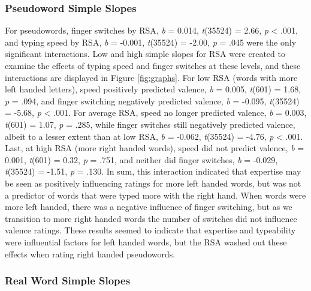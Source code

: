 \documentclass[english,man,man,mask]{apa6}
\theoremstyle{definition}
\theoremstyle{definition}
\theoremstyle{definition}
\theoremstyle{remark}
\begin{document}
\subsubsection{Pseudoword Simple Slopes}\label{pseudoword-simple-slopes}

For pseudowords, finger switches by RSA, \emph{b} = 0.014,
\emph{t}(35524) = 2.66, \emph{p} \textless{} .001, and typing speed by
RSA, \emph{b} = -0.001, \emph{t}(35524) = -2.00, \emph{p} = .045 were
the only significant interactions. Low and high simple slopes for RSA
were created to examine the effects of typing speed and finger switches
at these levels, and these interactions are displayed in Figure
\ref{fig:graphs}. For low RSA (words with more left handed letters),
speed positively predicted valence, \emph{b} = 0.005, \emph{t}(601) =
1.68, \emph{p} = .094, and finger switching negatively predicted
valence, \emph{b} = -0.095, \emph{t}(35524) = -5.68, \emph{p}
\textless{} .001. For average RSA, speed no longer predicted valence,
\emph{b} = 0.003, \emph{t}(601) = 1.07, \emph{p} = .285, while finger
switches still negatively predicted valence, albeit to a lesser extent
than at low RSA, \emph{b} = -0.062, \emph{t}(35524) = -4.76, \emph{p}
\textless{} .001. Last, at high RSA (more right handed words), speed did
not predict valence, \emph{b} = 0.001, \emph{t}(601) = 0.32, \emph{p} =
.751, and neither did finger switches, \emph{b} = -0.029,
\emph{t}(35524) = -1.51, \emph{p} = .130. In sum, this interaction
indicated that expertise may be seen as positively influencing ratings
for more left handed words, but was not a predictor of words that were
typed more with the right hand. When words were more left handed, there
was a negative influence of finger switching, but as we transition to
more right handed words the number of switches did not influence valence
ratings. These results seemed to indicate that expertise and typeability
were influential factors for left handed words, but the RSA washed out
these effects when rating right handed pseudowords.

\subsubsection{Real Word Simple Slopes}\label{real-word-simple-slopes}
\end{document}
